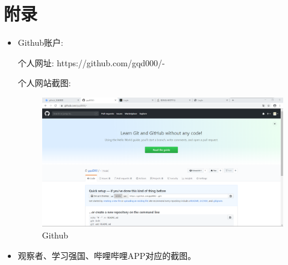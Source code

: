 \documentclass{article}
\begin{document}
\section{附录}
\begin{itemize}
    \item Github账户:\par
			个人网址: https://github.com/gqd000/-\par
			个人网站截图:\par
\begin{figure}[h!]
\centering
\includegraphics[scale=0.1]{Github}
\caption{Github}
\label{fig:Github}
\end{figure}

    \item 观察者、学习强国、哔哩哔哩APP对应的截图。\par


\end{itemize}
\end{document}
